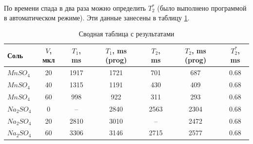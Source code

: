 По времени спада в два раза можно определить $ T_2^* $ (было выполнено программой в автоматическом режиме). Эти данные занесены в таблицу \ref{table:all-T}.



\begin{table}[ht]
	\caption{Сводная таблица с результатами}
	\label{table:all-T}
	\centering
	\begin{tabular}{|l|c|c|c|c|c|c|}
		\toprule
		Соль &  $V$, мкл & $T_1$, ms & $T_1$, ms (prog) & $T_2$, ms & $T_2$, ms (prog) & $T_2^*$, ms \\
		\midrule
		$MnSO_4$  	&  20 &  1917 & 1721 &   701 & 687	&  0.68 \\
		$MnSO_4$  	&  40 &  1315 & 1191 &   430 & 409	&  0.68 \\
		$MnSO_4$ 	&  60 &   998 & 922  &   311 & 293	&  0.68 \\
		$Na_2 SO_4$ &   0 &   --  & 2840 &  2563 & 2304 &  0.68 \\
		$Na_2 SO_4$ &  20 &  2810 & 3010 &   --  & 2472 &  0.68 \\
		$Na_2 SO_4$ &  60 &  3306 & 3146 &  2715 & 2577 &  0.68 \\
		\bottomrule
	\end{tabular}
\end{table}
